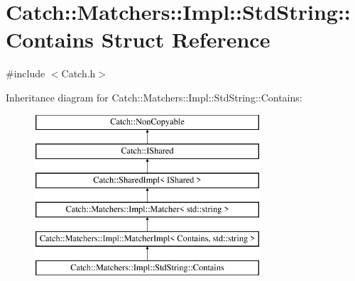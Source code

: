 \hypertarget{struct_catch_1_1_matchers_1_1_impl_1_1_std_string_1_1_contains}{}\section{Catch\+:\+:Matchers\+:\+:Impl\+:\+:Std\+String\+:\+:Contains Struct Reference}
\label{struct_catch_1_1_matchers_1_1_impl_1_1_std_string_1_1_contains}


{\ttfamily \#include $<$Catch.\+h$>$}

Inheritance diagram for Catch\+:\+:Matchers\+:\+:Impl\+:\+:Std\+String\+:\+:Contains\+:\begin{figure}[H]
\begin{center}
\leavevmode
\includegraphics[height=6.000000cm]{struct_catch_1_1_matchers_1_1_impl_1_1_std_string_1_1_contains}
\end{center}
\end{figure}
